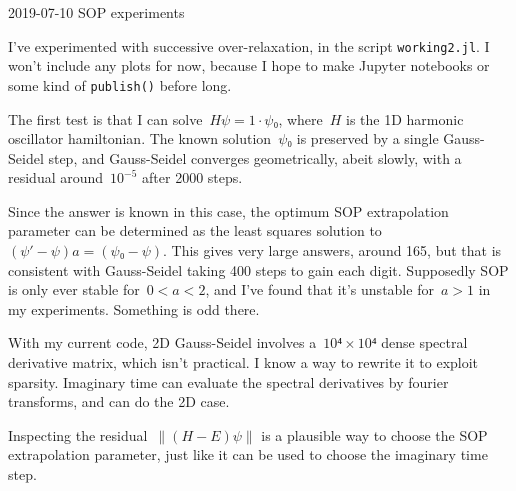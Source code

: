 2019-07-10 SOP experiments

I've experimented with successive over-relaxation, in the script {\tt working2.jl}.  I won't include any plots for now, because I hope to make Jupyter notebooks or some kind of {\tt publish()} before long.

The first test is that I can solve~$Hψ=1·ψ₀$, where~$H$ is the 1D harmonic oscillator hamiltonian.  The known solution~$ψ₀$ is preserved by a single Gauss-Seidel step, and Gauss-Seidel converges geometrically, abeit slowly, with a residual around~$10^{-5}$ after 2000 steps.

Since the answer is known in this case, the optimum SOP extrapolation parameter can be determined as the least squares solution to~$(ψ'-ψ)a=(ψ₀-ψ)$.  This gives very large answers, around 165, but that is consistent with Gauss-Seidel taking 400 steps to gain each digit.  Supposedly SOP is only ever stable for~$0<a<2$, and I've found that it's unstable for~$a>1$ in my experiments.  Something is odd there.

With my current code, 2D Gauss-Seidel involves a~$10⁴×10⁴$ dense spectral derivative matrix, which isn't practical.  I know a way to rewrite it to exploit sparsity.  Imaginary time can evaluate the spectral derivatives by fourier transforms, and can do the 2D case.

Inspecting the residual~$∥(H-E)ψ∥$ is a plausible way to choose the SOP extrapolation parameter, just like it can be used to choose the imaginary time step.


\bye